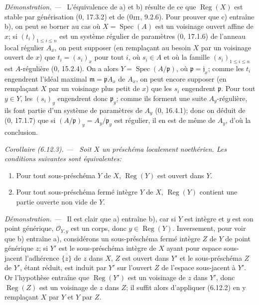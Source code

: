 \documentclass[10pt,oneside]{book}
\newcommand{\oldpage}[2][]{%
  \setcounter{footnote}{0}%
  \marginpar{\scriptsize\textbf{#1}~|~#2}\ignorespaces}
\newenvironment{corollary}[1][]{%
  \par\medskip\noindent\itshape Corollaire (#1). ---\ }{\par}
\newenvironment{proof}{%
  \par\medskip\noindent\textit{Démonstration. ---\ }}{\par}
\begin{document}
\begin{proof}
L'équivalence de a) et b) résulte de ce que $\operatorname{Reg}(X)$ est
stable par générisation (0, 17.3.2) et de (0$_{\rm III}$, 9.2.6). Pour
prouver que c) entraîne b), on peut se borner au cas où
$X=\operatorname{Spec}(A)$ est un voisinage ouvert affine de $x$; si
$(t_i)_{1\leq i\leq n}$ est un système régulier de paramètres (0, 17.1.6)
de l'anneau local régulier $A_x$, on peut supposer (en remplaçant au besoin
$X$ par un voisinage ouvert de $x$) que $t_i=(s_i)_x$ pour tout $i$, où
$s_i\in A$ et où la famille $(s_i)_{1\leq i\leq n}$ est $A$-régulière
(0, 15.2.4). On a alors $Y=\operatorname{Spec}(A/\mathfrak p)$, où
$\mathfrak p=\mathfrak j_x$; comme les $t_i$ engendrent l'idéal maximal
$\mathfrak m=\mathfrak pA_x$ de $A_x$, on peut encore supposer (en
remplaçant $X$ par un voisinage plus petit de $x$) que les $s_i$ engendrent
$\mathfrak p$. Pour tout $y\in Y$, les $(s_i)_y$ engendrent donc
$\mathfrak p_y$; comme ils forment une suite $A_y$-régulière, ils font
partie d'un système de paramètres de $A_y$ (0, 16.4.1); donc on déduit de
(0, 17.1.7) que si $(A/\mathfrak p)_y=A_y/\mathfrak p_y$ est régulier, il
en est de même de $A_y$, d'où la conclusion.
\end{proof}

\begin{corollary}[6.12.3]
\label{IV.2.s6.12.3-fr}
Soit $X$ un préschéma localement noethérien. Les conditions suivantes sont
équivalentes:
\begin{enumerate}
\item[a)] Pour tout sous-préschéma $Y$ de $X$,
$\operatorname{Reg}(Y)$ est ouvert dans $Y$.

\oldpage[IV-2]{164}

\item[b)] Pour tout sous-préschéma fermé intègre $Y$ de $X$,
$\operatorname{Reg}(Y)$ contient une partie ouverte non vide de $Y$.
\end{enumerate}
\end{corollary}

\begin{proof}
Il est clair que a) entraîne b), car si $Y$ est intègre et $y$ est son point
générique, $\mathcal O_{Y,y}$ est un corps, donc $y\in\operatorname{Reg}(Y)$.
Inversement, pour voir que b) entraîne a), considérons un sous-préschéma
fermé intègre $Z$ de $Y$ de point générique $z$; si $Y'$ est le
sous-préschéma intègre de $X$ ayant pour espace sous-jacent l'adhérence
$\overline{\{z\}}$ de $z$ dans $X$, $Z$ est ouvert dans $Y'$ et le
sous-préschéma $Z$ de $Y'$, étant réduit, est induit par $Y'$ sur l'ouvert
$Z$ de l'espace sous-jacent à $Y'$. Or l'hypothèse entraîne que
$\operatorname{Reg}(Y')$ est un voisinage de $z$ dans $Y'$, donc
$\operatorname{Reg}(Z)$ est un voisinage de $z$ dans $Z$; il suffit alors
d'appliquer (6.12.2) en y remplaçant $X$ par $Y$ et $Y$ par $Z$.
\end{proof}
\end{document}
